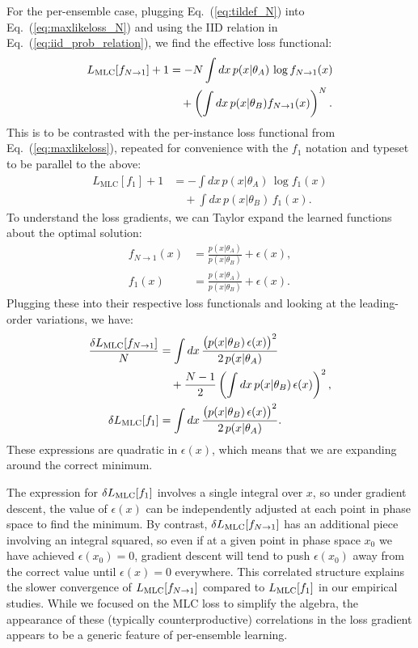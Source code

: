 \documentclass[aps,prx,reprint,preprintnumbers,superscriptaddress,nofootinbib,longbibliography,floatfix]{revtex4-2}
\newcommand{\thetaup}{\theta_A}
\newcommand{\thetadown}{\theta_B}
\DeclareRobustCommand{\Eq}[1]{Eq.~(\ref{eq:#1})}
\begin{document}
For the per-ensemble case, plugging \Eq{tildef_N} into \Eq{maxlikeloss_N} and using the IID relation in \Eq{iid_prob_relation}, we find the effective loss functional:
%
\begin{align}
\nonumber L_{\rm MLC}[f_{N \to 1}] + 1 &= - N \int dx \, p(x|\thetaup) \, \log f_{N \to 1}(x) \\
& \quad +  \left( \int dx \, p(x|\thetadown) f_{N \to 1}(x) \right)^N.
\end{align}
%
This is to be contrasted with the per-instance loss functional from \Eq{maxlikeloss}, repeated for convenience with the $f_1$ notation and typeset to be parallel to the above:
\begin{align}
\nonumber
L_\text{MLC}[f_1] + 1 &= - \int dx \, p(x|\thetaup) \, \log f_1(x) \\
& \quad + \int dx \, p(x|\thetadown) \, f_1(x).
\label{eq:maxlikeloss_alt}
\end{align}
%
To understand the loss gradients, we can Taylor expand the learned functions about the optimal solution:
%
\begin{align}
f_{N \to 1}(x) & = \frac{p(x|\thetaup)}{p(x|\thetadown)} + \epsilon(x),\\
f_{1}(x) & = \frac{p(x|\thetaup)}{p(x|\thetadown)} + \epsilon(x).
\end{align}
%
Plugging these into their respective loss functionals and looking at the leading-order variations, we have:
%
\begin{align}
\nonumber \frac{\delta L_{\rm MLC}[f_{N \to 1}]}{N} &=  \int dx \, \frac{\big( p(x|\thetadown) \, \epsilon(x) \big)^2}{2 \, p(x|\thetaup)} \\
& \quad + \frac{N-1}{2} \left( \int dx \, p(x|\thetadown) \, \epsilon(x)  \right)^2,\\
\delta L_{\rm MLC}[f_{1}] &= \int dx \, \frac{\big( p(x|\thetadown) \, \epsilon(x) \big)^2}{2 \, p(x|\thetaup)}.
\end{align}
%
These expressions are quadratic in $\epsilon(x)$, which means that we are expanding around the correct minimum.


The expression for $\delta L_{\rm MLC}[f_{1}]$ involves a single integral over $x$, so under gradient descent, the value of $\epsilon(x)$ can be independently adjusted at each point in phase space to find the minimum.
%
By contrast, $\delta L_{\rm MLC}[f_{N \to 1}]$ has an additional piece involving an integral squared, so even if at a given point in phase space $x_0$ we have achieved $\epsilon(x_0) = 0$, gradient descent will tend to push $\epsilon(x_0)$ away from the correct value until $\epsilon(x) = 0$ everywhere.
%
This correlated structure explains the slower convergence of $L_{\rm MLC}[f_{N \to 1}]$ compared to $L_{\rm MLC}[f_{1}]$ in our empirical studies.
%
While we focused on the MLC loss to simplify the algebra, the appearance of these (typically counterproductive) correlations in the loss gradient appears to be a generic feature of per-ensemble learning.
\end{document}
